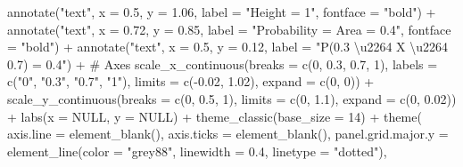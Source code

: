 \documentclass[
  letterpaper,
  DIV=11,
  numbers=noendperiod]{scrreprt}
\newenvironment{Shaded}{\begin{snugshade}}{\end{snugshade}}
\newcommand{\AttributeTok}[1]{\textcolor[rgb]{0.40,0.45,0.13}{#1}}
\newcommand{\CommentTok}[1]{\textcolor[rgb]{0.37,0.37,0.37}{#1}}
\newcommand{\ConstantTok}[1]{\textcolor[rgb]{0.56,0.35,0.01}{#1}}
\newcommand{\DecValTok}[1]{\textcolor[rgb]{0.68,0.00,0.00}{#1}}
\newcommand{\FloatTok}[1]{\textcolor[rgb]{0.68,0.00,0.00}{#1}}
\newcommand{\FunctionTok}[1]{\textcolor[rgb]{0.28,0.35,0.67}{#1}}
\newcommand{\NormalTok}[1]{\textcolor[rgb]{0.00,0.23,0.31}{#1}}
\newcommand{\SpecialCharTok}[1]{\textcolor[rgb]{0.37,0.37,0.37}{#1}}
\newcommand{\StringTok}[1]{\textcolor[rgb]{0.13,0.47,0.30}{#1}}
\begin{document}
\begin{Shaded}
\begin{Highlighting}[]
  \FunctionTok{annotate}\NormalTok{(}\StringTok{"text"}\NormalTok{, }\AttributeTok{x =} \FloatTok{0.5}\NormalTok{, }\AttributeTok{y =} \FloatTok{1.06}\NormalTok{,}
           \AttributeTok{label =} \StringTok{"Height = 1"}\NormalTok{, }\AttributeTok{fontface =} \StringTok{"bold"}\NormalTok{) }\SpecialCharTok{+}
  \FunctionTok{annotate}\NormalTok{(}\StringTok{"text"}\NormalTok{, }\AttributeTok{x =} \FloatTok{0.72}\NormalTok{, }\AttributeTok{y =} \FloatTok{0.85}\NormalTok{,}
           \AttributeTok{label =} \StringTok{"Probability = Area = 0.4"}\NormalTok{, }\AttributeTok{fontface =} \StringTok{"bold"}\NormalTok{) }\SpecialCharTok{+}
  \FunctionTok{annotate}\NormalTok{(}\StringTok{"text"}\NormalTok{, }\AttributeTok{x =} \FloatTok{0.5}\NormalTok{, }\AttributeTok{y =} \FloatTok{0.12}\NormalTok{,}
           \AttributeTok{label =} \StringTok{"P(0.3 \textbackslash{}u2264 X \textbackslash{}u2264 0.7) = 0.4"}\NormalTok{) }\SpecialCharTok{+}
  \CommentTok{\# Axes}
  \FunctionTok{scale\_x\_continuous}\NormalTok{(}\AttributeTok{breaks =} \FunctionTok{c}\NormalTok{(}\DecValTok{0}\NormalTok{, }\FloatTok{0.3}\NormalTok{, }\FloatTok{0.7}\NormalTok{, }\DecValTok{1}\NormalTok{),}
                     \AttributeTok{labels =} \FunctionTok{c}\NormalTok{(}\StringTok{"0"}\NormalTok{, }\StringTok{"0.3"}\NormalTok{, }\StringTok{"0.7"}\NormalTok{, }\StringTok{"1"}\NormalTok{),}
                     \AttributeTok{limits =} \FunctionTok{c}\NormalTok{(}\SpecialCharTok{{-}}\FloatTok{0.02}\NormalTok{, }\FloatTok{1.02}\NormalTok{),}
                     \AttributeTok{expand =} \FunctionTok{c}\NormalTok{(}\DecValTok{0}\NormalTok{, }\DecValTok{0}\NormalTok{)) }\SpecialCharTok{+}
  \FunctionTok{scale\_y\_continuous}\NormalTok{(}\AttributeTok{breaks =} \FunctionTok{c}\NormalTok{(}\DecValTok{0}\NormalTok{, }\FloatTok{0.5}\NormalTok{, }\DecValTok{1}\NormalTok{),}
                     \AttributeTok{limits =} \FunctionTok{c}\NormalTok{(}\DecValTok{0}\NormalTok{, }\FloatTok{1.1}\NormalTok{),}
                     \AttributeTok{expand =} \FunctionTok{c}\NormalTok{(}\DecValTok{0}\NormalTok{, }\FloatTok{0.02}\NormalTok{)) }\SpecialCharTok{+}
  \FunctionTok{labs}\NormalTok{(}\AttributeTok{x =} \ConstantTok{NULL}\NormalTok{, }\AttributeTok{y =} \ConstantTok{NULL}\NormalTok{) }\SpecialCharTok{+}
  \FunctionTok{theme\_classic}\NormalTok{(}\AttributeTok{base\_size =} \DecValTok{14}\NormalTok{) }\SpecialCharTok{+}
  \FunctionTok{theme}\NormalTok{(}
    \AttributeTok{axis.line =} \FunctionTok{element\_blank}\NormalTok{(),}
    \AttributeTok{axis.ticks =} \FunctionTok{element\_blank}\NormalTok{(),}
    \AttributeTok{panel.grid.major.y =} \FunctionTok{element\_line}\NormalTok{(}\AttributeTok{color =} \StringTok{"grey88"}\NormalTok{, }\AttributeTok{linewidth =} \FloatTok{0.4}\NormalTok{, }\AttributeTok{linetype =} \StringTok{"dotted"}\NormalTok{),}

\end{Highlighting}
\end{Shaded}
\end{document}
